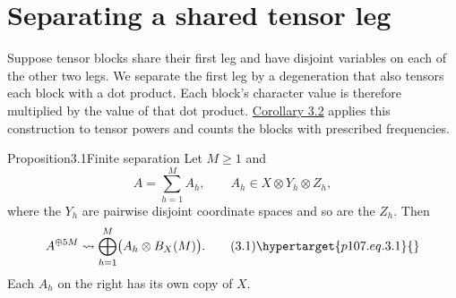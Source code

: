 \section{Separating a shared tensor leg}\hypertarget{p107.sec.3}{}
Suppose tensor blocks share their first leg and have disjoint variables on each of the other two legs. We separate the first leg by a degeneration that also tensors each block with a dot product. Each block's character value is therefore multiplied by the value of that dot product. \hyperlink{p107.result.3.2}{Corollary 3.2} applies this construction to tensor powers and counts the blocks with prescribed frequencies.

\begin{result}{Proposition}{3.1}{Finite separation}
Let $M\ge1$ and
\[A=\sum_{h=1}^M A_h,\qquad A_h\in X\otimes Y_h\otimes Z_h,\]
where the $Y_h$ are pairwise disjoint coordinate spaces and so are the $Z_h$. Then
\begin{equation}A^{\oplus5M}\rightsquigarrow\bigoplus_{h=1}^M\bigl(A_h\otimes B_X(M)\bigr).\tag{3.1}\hypertarget{p107.eq.3.1}{}\end{equation}
Each $A_h$ on the right has its own copy of $X$.
\end{result}
